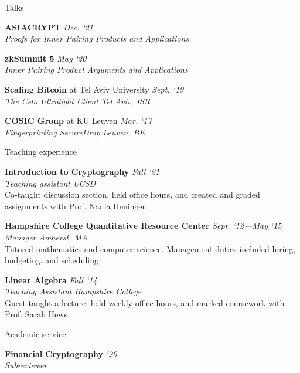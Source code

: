 \documentclass{cv}
\begin{document}
\begin{rSection}{Talks}

\textbf{ASIACRYPT} \hfill \emph{Dec. `21} \\
\emph{Proofs for Inner Pairing Products and Applications}

\textbf{zkSummit 5} \hfill \emph{May `20} \\
\emph{Inner Pairing Product Arguments and Applications}

\textbf{Scaling Bitcoin} at Tel Aviv University \hfill \emph{Sept. `19} \\
\emph{The Celo Ultralight Client} \hfill \emph{Tel Aviv, ISR}

\textbf{COSIC Group} at KU Leuven \hfill \emph{Mar. `17} \\
\emph{Fingerprinting SecureDrop} \hfill \emph{Leuven, BE}

\end{rSection}

\begin{rSection}{Teaching experience}

\textbf{Introduction to Cryptography} \hfill \emph{Fall `21} \\
\emph{Teaching assistant} \hfill \emph{UCSD} \\
{\small Co-taught discussion section, held office hours, and created and graded assignments with Prof. Nadia Heninger.}

\textbf{Hampshire College Quantitative Resource Center} \hfill \emph{Sept. `12---May `15} \\
\emph{Manager} \hfill \emph{Amherst, MA} \\
{\small Tutored mathematics and computer science. Management duties included hiring, budgeting, and scheduling.}

\textbf{Linear Algebra} \hfill \emph{Fall `14} \\
\emph{Teaching Assistant} \hfill \emph{Hampshire College} \\
{\small Guest taught a lecture, held weekly office hours, and marked coursework with Prof. Sarah Hews.}

\end{rSection}

\pagebreak
\begin{rSection}{Academic service}

\textbf{Financial Cryptography} \hfill \emph{`20} \\
\emph{Subreviewer} \\

\end{rSection}
\end{document}
